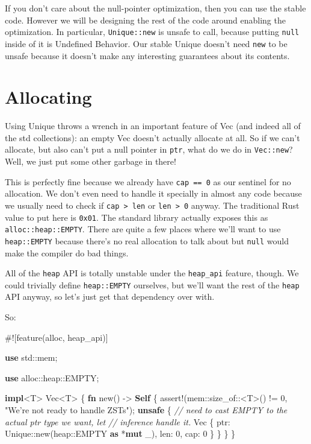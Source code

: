 \documentclass[a4paper,]{book}
\newenvironment{Shaded}{\begin{snugshade}}{\end{snugshade}}
\newcommand{\KeywordTok}[1]{\textcolor[rgb]{0.13,0.29,0.53}{\textbf{{#1}}}}
\newcommand{\DecValTok}[1]{\textcolor[rgb]{0.00,0.00,0.81}{{#1}}}
\newcommand{\StringTok}[1]{\textcolor[rgb]{0.31,0.60,0.02}{{#1}}}
\newcommand{\CommentTok}[1]{\textcolor[rgb]{0.56,0.35,0.01}{\textit{{#1}}}}
\newcommand{\OtherTok}[1]{\textcolor[rgb]{0.56,0.35,0.01}{{#1}}}
\newcommand{\NormalTok}[1]{{#1}}
\begin{document}
If you don't care about the null-pointer optimization, then you can use
the stable code. However we will be designing the rest of the code
around enabling the optimization. In particular, \texttt{Unique::new} is
unsafe to call, because putting \texttt{null} inside of it is Undefined
Behavior. Our stable Unique doesn't need \texttt{new} to be unsafe
because it doesn't make any interesting guarantees about its contents.

\section{Allocating}\label{sec--vec-alloc}

Using Unique throws a wrench in an important feature of Vec (and indeed
all of the std collections): an empty Vec doesn't actually allocate at
all. So if we can't allocate, but also can't put a null pointer in
\texttt{ptr}, what do we do in \texttt{Vec::new}? Well, we just put some
other garbage in there!

This is perfectly fine because we already have \texttt{cap\ ==\ 0} as
our sentinel for no allocation. We don't even need to handle it
specially in almost any code because we usually need to check if
\texttt{cap\ \textgreater{}\ len} or \texttt{len\ \textgreater{}\ 0}
anyway. The traditional Rust value to put here is \texttt{0x01}. The
standard library actually exposes this as \texttt{alloc::heap::EMPTY}.
There are quite a few places where we'll want to use
\texttt{heap::EMPTY} because there's no real allocation to talk about
but \texttt{null} would make the compiler do bad things.

All of the \texttt{heap} API is totally unstable under the
\texttt{heap\_api} feature, though. We could trivially define
\texttt{heap::EMPTY} ourselves, but we'll want the rest of the
\texttt{heap} API anyway, so let's just get that dependency over with.

So:

\begin{Shaded}
\begin{Highlighting}[]
\NormalTok{#![feature(alloc, heap_api)]}

\KeywordTok{use} \NormalTok{std::mem;}

\KeywordTok{use} \NormalTok{alloc::heap::EMPTY;}

\KeywordTok{impl}\NormalTok{<T> Vec<T> \{}
    \KeywordTok{fn} \NormalTok{new() -> }\KeywordTok{Self} \NormalTok{\{}
        \OtherTok{assert!}\NormalTok{(mem::size_of::<T>() != }\DecValTok{0}\NormalTok{, }\StringTok{"We're not ready to handle ZSTs"}\NormalTok{);}
        \KeywordTok{unsafe} \NormalTok{\{}
            \CommentTok{// need to cast EMPTY to the actual ptr type we want, let}
            \CommentTok{// inference handle it.}
            \NormalTok{Vec \{ ptr: Unique::new(heap::EMPTY }\KeywordTok{as} \NormalTok{*}\KeywordTok{mut} \NormalTok{_), len: }\DecValTok{0}\NormalTok{, cap: }\DecValTok{0} \NormalTok{\}}
        \NormalTok{\}}
    \NormalTok{\}}
\NormalTok{\}}
\end{Highlighting}
\end{Shaded}
\end{document}
